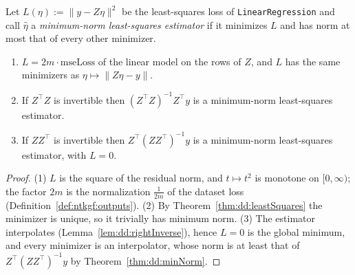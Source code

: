 \begin{theorem}\label{thm:dd:minNormLS}
  \leanok
Let $L(\eta):=\|y-Z\eta\|^2$ be the least-squares loss of \texttt{LinearRegression} and call $\hat\eta$ a \emph{minimum-norm least-squares
estimator} if it minimizes $L$ and has norm at most that of every other minimizer.
\begin{enumerate}
  \item $L=2m\cdot\mathrm{mseLoss}$ of the linear model on the rows of $Z$, and $L$ has the same minimizers as $\eta\mapsto\|Z\eta-y\|$.
  \item If $Z^\top Z$ is invertible then $(Z^\top Z)^{-1}Z^\top y$ is a minimum-norm least-squares estimator.
  \item If $ZZ^\top$ is invertible then $Z^\top(ZZ^\top)^{-1}y$ is a minimum-norm least-squares estimator, with $L=0$.
\end{enumerate}
\end{theorem}

\begin{proof}
  \leanok
(1) $L$ is the square of the residual norm, and $t\mapsto t^2$ is monotone on $[0,\infty)$; the factor $2m$ is the normalization $\tfrac1{2m}$ of the
dataset loss (Definition~\ref{def:ntkgf:outputs}). (2) By Theorem~\ref{thm:dd:leastSquares} the minimizer is unique, so it trivially has minimum norm.
(3) The estimator interpolates (Lemma~\ref{lem:dd:rightInverse}), hence $L=0$ is the global minimum, and every minimizer is an interpolator,
whose norm is at least that of $Z^\top(ZZ^\top)^{-1}y$ by Theorem~\ref{thm:dd:minNorm}.
\end{proof}

